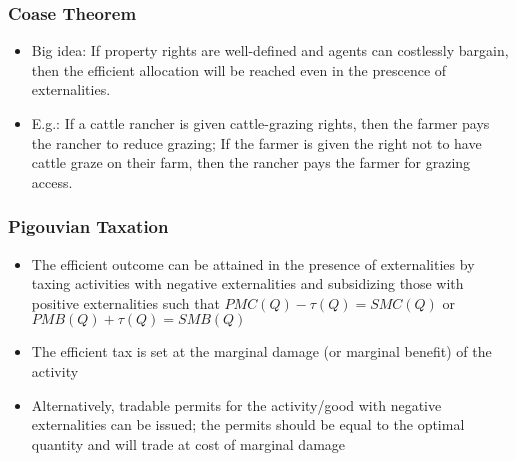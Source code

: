 \documentclass{article}
\newcommand{\blue}[1]{{\color{blue}#1}}
\begin{document}
\subsubsection{Coase Theorem}
\begin{itemize}
	\item \blue{Big idea:} If property rights are well-defined and agents can costlessly bargain, then the efficient allocation will be reached even in the prescence of externalities.
	\item E.g.: If a cattle rancher is given cattle-grazing rights, then the farmer pays the rancher to reduce grazing; If the farmer is given the right not to have cattle graze on their farm, then the rancher pays the farmer for grazing access.
\end{itemize}

\subsubsection{Pigouvian Taxation}
\begin{itemize}
	\item The efficient outcome can be attained in the presence of externalities by taxing activities with negative externalities and subsidizing those with positive externalities such that ${PMC(Q) -\tau(Q)=SMC(Q)}$ or ${PMB(Q) + \tau(Q)=SMB(Q)}$
	\item The efficient tax is set at the marginal damage (or marginal benefit) of the activity
	\item Alternatively, tradable permits for the activity/good with negative externalities can be issued; the permits should be equal to the optimal quantity and will trade at cost of marginal damage
\end{itemize}

\end{document}
